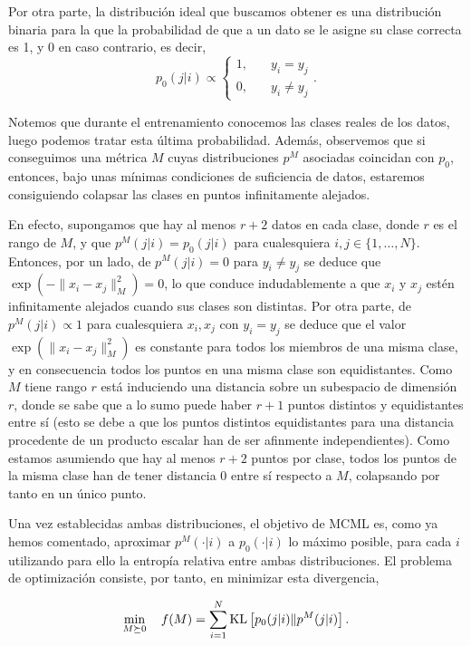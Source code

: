 Por otra parte, la distribución ideal que buscamos obtener es una distribución binaria para la que la probabilidad de que a un dato se le asigne su clase correcta es 1, y 0 en caso contrario, es decir,
\begin{equation}
    p_0(j|i) \propto \begin{cases}1, &\quad y_i = y_j \\ 0, &\quad y_i \ne y_j\end{cases}.
\end{equation}

Notemos que durante el entrenamiento conocemos las clases reales de los datos, luego podemos tratar esta última probabilidad. Además, observemos que si conseguimos una métrica $M$ cuyas distribuciones $p^M$ asociadas coincidan con $p_0$, entonces, bajo unas mínimas condiciones de suficiencia de datos, estaremos consiguiendo colapsar las clases en puntos infinitamente alejados. 

En efecto, supongamos que hay al menos $r + 2$ datos en cada clase, donde $r$ es el rango de $M$, y que $p^M(j|i) = p_0(j|i)$ para cualesquiera $i,j \in \{1,\dots,N\}$. Entonces, por un lado, de $p^M(j|i) = 0$ para $y_i \ne y_j$ se deduce que $\exp(-\|x_i-x_j\|^2_M) = 0$, lo que conduce indudablemente a que $x_i$ y $x_j$ estén infinitamente alejados cuando sus clases son distintas. Por otra parte, de $p^M(j|i) \propto 1$ para cualesquiera $x_i,x_j$ con $y_i = y_j$ se deduce que el valor $\exp(\|x_i-x_j\|_M^2)$ es constante para todos los miembros de una misma clase, y en consecuencia todos los puntos en una misma clase son equidistantes. Como $M$ tiene rango $r$ está induciendo una distancia sobre un subespacio de dimensión $r$, donde se sabe que a lo sumo puede haber $r+1$ puntos distintos y equidistantes entre sí (esto se debe a que los puntos distintos equidistantes para una distancia procedente de un producto escalar han de ser afinmente independientes). Como estamos asumiendo que hay al menos $r+2$ puntos por clase, todos los puntos de la misma clase han de tener distancia 0 entre sí respecto a $M$, colapsando por tanto en un único punto.

Una vez establecidas ambas distribuciones, el objetivo de MCML es, como ya hemos comentado, aproximar $p^M(\cdot|i)$ a $p_0(\cdot|i)$ lo máximo posible, para cada $i$ utilizando para ello la entropía relativa entre ambas distribuciones. El problema de optimización consiste, por tanto, en minimizar esta divergencia,

\begin{equation}
    \min_{M \succeq 0}\quad f(M) = \sum_{i=1}^N \operatorname{KL} \left[ p_0(j|i) \| p^M(j|i) \right].
\end{equation} 

